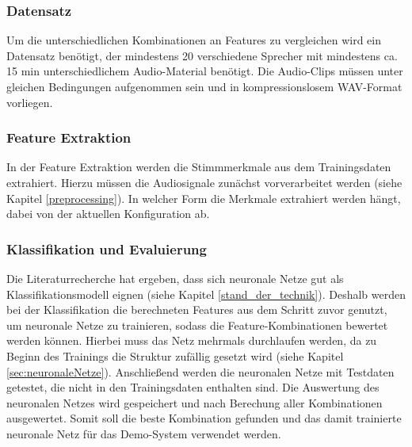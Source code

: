


\subsubsection{Datensatz}

Um die unterschiedlichen Kombinationen an Features zu vergleichen wird ein Datensatz benötigt, der mindestens 20 verschiedene Sprecher mit mindestens ca. 15 min unterschiedlichem Audio-Material benötigt.
Die Audio-Clips müssen unter gleichen Bedingungen aufgenommen sein und in kompressionslosem WAV-Format vorliegen.

\subsubsection{Feature Extraktion}

In der Feature Extraktion werden die Stimmmerkmale aus dem Trainingsdaten extrahiert.
Hierzu müssen die Audiosignale zunächst vorverarbeitet werden (siehe Kapitel \ref{preprocessing}).
In welcher Form die Merkmale extrahiert werden hängt, dabei von der aktuellen Konfiguration ab.

\subsubsection{Klassifikation und Evaluierung}

Die Literaturrecherche hat ergeben, dass sich neuronale Netze gut als Klassifikationsmodell eignen (siehe Kapitel \ref{stand_der_technik}). 
Deshalb werden bei der Klassifikation die berechneten Features aus dem Schritt zuvor genutzt, um neuronale Netze zu trainieren, sodass die Feature-Kombinationen bewertet werden können.
Hierbei muss das Netz mehrmals durchlaufen werden, da zu Beginn des Trainings die Struktur zufällig gesetzt wird (siehe Kapitel \ref{sec:neuronaleNetze}).
Anschließend werden die neuronalen Netze mit Testdaten getestet, die nicht in den Trainingsdaten enthalten sind.
Die Auswertung des neuronalen Netzes wird gespeichert und nach Berechung aller Kombinationen ausgewertet.
Somit soll die beste Kombination gefunden und das damit trainierte neuronale Netz für das Demo-System verwendet werden.

